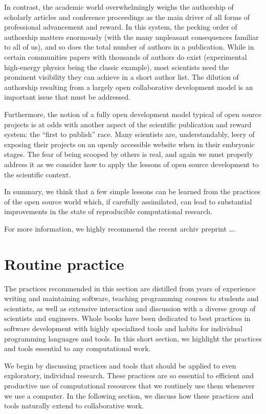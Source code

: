 \documentclass[ChapterTOCs,krantz2]{krantz} %
\theoremstyle{definition}
\begin{document}
In contrast, the academic world overwhelmingly weighs the authorship
of scholarly articles and conference proceedings as the main driver
of all forms of professional advancement and reward. In this system,
the pecking order of authorship matters enormously (with the many
unpleasant consequences familiar to all of us), and so does the total
number of authors in a publication. While in certain communities papers
with thousands of authors do exist (experimental high-energy physics
being the classic example), most scientists need the prominent visibility
they can achieve in a short author list. The dilution of authorship
resulting from a largely open collaborative development model
is an important issue that must be addressed.

Furthermore, the notion of a fully open development model typical
of open source projects is at odds with another aspect of the
scientific publication and reward system: the ``first
to publish'' race. Many scientists are, understandably,
leery of exposing their projects on an openly accessible website
when in their embryonic stages. The fear of being scooped by others
is real, and again we must properly address it as we consider
how to apply the lessons of open source development to the scientific
context.

In summary, we think that a few simple lessons can be learned from
the practices of the open source world which, if carefully assimilated,
can lead to substantial improvements in the state of reproducible
computational research. 

For more information, we highly recommend the recent archiv preprint
\ldots \cite{2012arXiv1210.0530A}.

\section{\label{sec:practice}Routine practice}

The practices recommended in this section are distilled from years of
experience writing and maintaining software, teaching programming courses to
students and scientists, as well as extensive interaction and discussion with a
diverse group of scientists and engineers.  Whole books have been dedicated to
best practices in software development with highly specialized tools and habits
for individual programming languages and tools.  In this short section, we
highlight the practices and tools essential to any computational work.

We begin by discussing practices and tools that should be applied to even
exploratory, individual research.  These practices are so essential to
efficient and productive use of computational resources that we routinely use
them whenever we use a computer. In the following section, we discuss how these
practices and tools naturally extend to collaborative work. 
\end{document}
